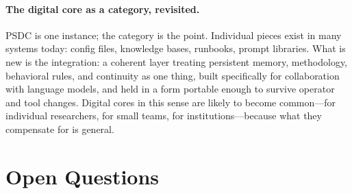 \documentclass[12pt]{article}
\begin{document}
\paragraph{The digital core as a category, revisited.} PSDC is one instance; the category is the point. Individual pieces exist in many systems today: config files, knowledge bases, runbooks, prompt libraries. What is new is the integration: a coherent layer treating persistent memory, methodology, behavioral rules, and continuity as one thing, built specifically for collaboration with language models, and held in a form portable enough to survive operator and tool changes. Digital cores in this sense are likely to become common---for individual researchers, for small teams, for institutions---because what they compensate for is general.

\section{Open Questions}
\label{sec:open}
\end{document}
